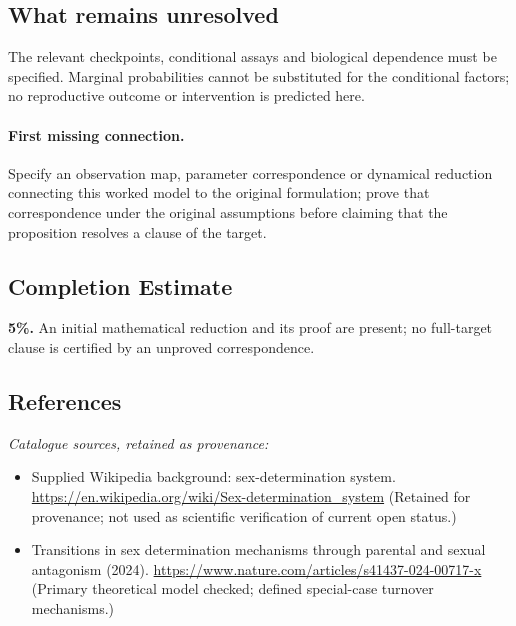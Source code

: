 \documentclass[11pt]{article}
\begin{document}
\subsection{What remains unresolved}
The relevant checkpoints, conditional assays and biological dependence must be specified. Marginal probabilities cannot be substituted for the conditional factors; no reproductive outcome or intervention is predicted here.
\paragraph{First missing connection.} Specify an observation map, parameter correspondence or dynamical reduction connecting this worked model to the original formulation; prove that correspondence under the original assumptions before claiming that the proposition resolves a clause of the target.
\subsection{Completion Estimate}
\textbf{5\%.} An initial mathematical reduction and its proof are present; no full-target clause is certified by an unproved correspondence.
\subsection{References}
\noindent\emph{Catalogue sources, retained as provenance:}
\begin{itemize}
\item Supplied Wikipedia background: sex-determination system. \url{https://en.wikipedia.org/wiki/Sex-determination_system} (Retained for provenance; not used as scientific verification of current open status.)
\item Transitions in sex determination mechanisms through parental and sexual antagonism (2024). \url{https://www.nature.com/articles/s41437-024-00717-x} (Primary theoretical model checked; defined special-case turnover mechanisms.)
\end{itemize}
\end{document}
